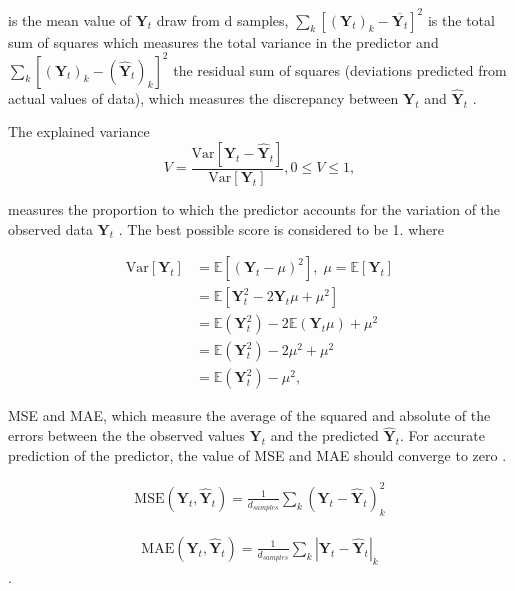 is the mean value of $\textbf{Y}_{t}$ draw from d samples,  
 $\sum_{k}\left[(\textbf{Y}_{t})_{k}-\overline{\textbf{Y}_{t}}\right]^2$ is the total sum of squares which measures the total variance in the predictor and $\sum_{k} \left[(\textbf{Y}_{t})_{k}-(\widehat{\textbf{Y}}_{t})_{k}\right]^2$ the residual sum of squares (deviations predicted from actual values of data), which measures the discrepancy between $\textbf{Y}_{t}$ and $\widehat{\textbf{Y}}_{t}$ \citep{james2013introduction}.

The explained variance
\begin{equation}
V=\frac{\text{Var}\left[\textbf{Y}_{t}-\widehat{\textbf{Y}}_{t} \right]}{\text{Var}\left[\textbf{Y}_{t}\right]}, 0 \leq V \leq 1, 
\label{ExV}
\end{equation}  

measures the proportion to which the predictor accounts for the variation of the observed data $\textbf{Y}_{t}$ \citep{bellinger2016fundamental}. The best possible score is considered to be 1. where 

\begin{align*}
\text{Var}\left[\textbf{Y}_{t}\right]&=\mathbb{E}\left[(\textbf{Y}_{t}-\mu)^2\right],\; \mu=\mathbb{E}\left[\textbf{Y}_{t}\right]\\
&=\mathbb{E}\left[\textbf{Y}_{t}^2-2\textbf{Y}_{t} \mu +\mu^2\right]\\
&=\mathbb{E}(\textbf{Y}_{t}^2)- 2\mathbb{E}(\textbf{Y}_{t} \mu) + \mu^2\\
&=\mathbb{E}(\textbf{Y}_{t}^2)-2 \mu^2 + \mu^2\\
&=\mathbb{E}(\textbf{Y}_{t}^2)-\mu^2,
\end{align*}
\citep{fortmann2012understanding}

MSE and MAE, which measure the average of the squared and absolute of the errors between the the observed values $\textbf{Y}_{t}$ and the predicted $\widehat{\textbf{Y}}_{t}$. For accurate prediction of the predictor, the value of MSE and MAE should converge to zero \citep{james2013introduction}. 

\begin{align}
\text{MSE}\left(\textbf{Y}_{t},\widehat{\textbf{Y}}_{t} \right)=\frac{1}{d_{samples}} \sum_{k} (\textbf{Y}_{t}-\widehat{\textbf{Y}}_{t})^2_{k}
\label{MSE}
\end{align}

\begin{align}
\text{MAE}\left(\textbf{Y}_{t},\widehat{\textbf{Y}}_{t} \right)=\frac{1}{d_{samples}} \sum_{k} \left|\textbf{Y}_{t}-\widehat{\textbf{Y}}_{t}\right|_{k}
\label{MAE}
\end{align}.

